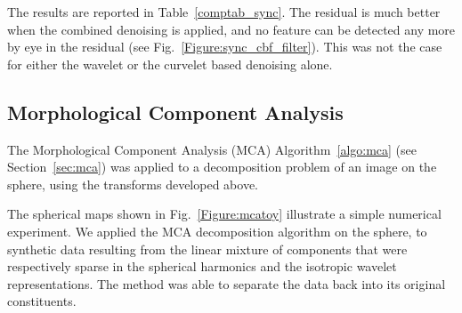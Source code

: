 The results are reported in Table~\ref{comptab_sync}. The residual is much better when the combined denoising is applied, and no feature can be detected any more by eye in the residual (see Fig.~\ref{Figure:sync_cbf_filter}). This was not the case for either the wavelet or the curvelet based denoising alone.





\subsection{Morphological Component Analysis}
\label{sect_mca}


The Morphological Component Analysis (MCA) Algorithm~\ref{algo:mca} (see Section~\ref{sec:mca}) was applied to a decomposition problem of an image on the sphere, using the transforms developed above.

The spherical maps shown in Fig.~\ref{Figure:mcatoy} illustrate a simple numerical experiment. We applied the MCA decomposition algorithm on the sphere, to synthetic data resulting from the linear mixture of components that were respectively sparse in the spherical harmonics and the isotropic wavelet representations. The method was able to separate the data back into its original constituents.  
 
